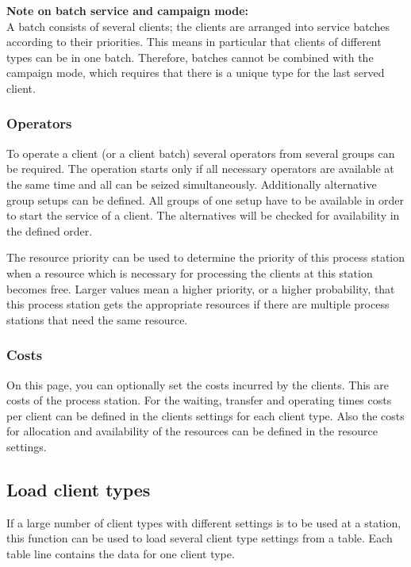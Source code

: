 \textbf{Note on batch service and campaign mode:}~\\
A batch consists of several clients; the clients are arranged into service batches according to their priorities.
This means in particular that clients of different types can be in one batch. Therefore, batches cannot
be combined with the campaign mode, which requires that there is a unique type for the last served client.

\subsubsection*{Operators}

To operate a client (or a client batch) several operators from several groups can be required.
The operation starts only if all necessary operators are available at the same time and all can be seized
simultaneously.
Additionally alternative group setups can be defined. All groups of one setup have to be available in order
to start the service of a client. The alternatives will be checked for availability in the defined order.

The resource priority can be used to determine the priority of this process station when a resource
which is necessary for processing the clients at this station becomes free. Larger values mean a
higher priority, or a higher probability, that this process station gets the appropriate resources
if there are multiple process stations that need the same resource.

\subsubsection*{Costs}

On this page, you can optionally set the costs incurred by the clients. This are costs of the process station.
For the waiting, transfer and operating times costs per client can be defined in the clients settings for each
client type. Also the costs for allocation and availability of the resources can be defined in the resource settings.

\subsection*{Load client types}

If a large number of client types with different settings is to be used at a station, this function can be used
to load several client type settings from a table. Each table line contains the data for one client type.

